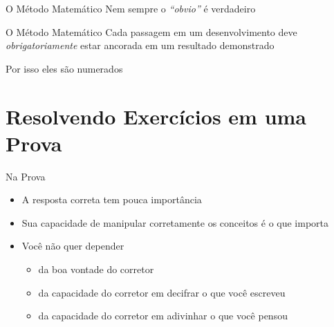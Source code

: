 \documentclass[fleqn,utf8,aspectratio=169,12pt,ignorenonframetext]{beamer}
\begin{document}
\begin{frame}{O Método Matemático}
  Nem sempre o \textit{``obvio''} é verdadeiro
\end{frame}

\begin{frame}{O Método Matemático}
  Cada passagem em um desenvolvimento deve \\
  \emph{obrigatoriamente}
  estar ancorada em um resultado demonstrado

  \pause
  \vspace{\baselineskip}
  Por isso eles são numerados
\end{frame}

\section{Resolvendo Exercícios em uma Prova}

\begin{frame}{Na Prova}
  \begin{itemize}[<+->]
    \item A resposta correta tem pouca importância
    \item Sua capacidade de manipular corretamente os conceitos é o que importa
    \item Você não quer depender
    \begin{itemize}
      \item da boa vontade do corretor
      \item da capacidade do corretor em decifrar o que você escreveu
      \item da capacidade do corretor em adivinhar o que você pensou
    \end{itemize}
  \end{itemize}
\end{frame}
\end{document}
